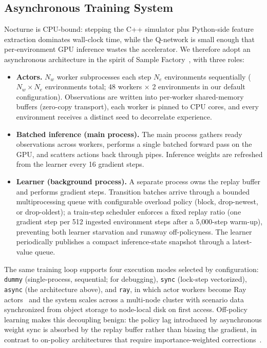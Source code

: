 \documentclass{article}
\begin{document}
\subsection{Asynchronous Training System}
\label{sec:system}

Nocturne is CPU-bound: stepping the C++ simulator plus Python-side feature
extraction dominates wall-clock time, while the Q-network is small enough
that per-environment GPU inference wastes the accelerator. We therefore
adopt an asynchronous architecture in the spirit of Sample
Factory~\citep{petrenko2020sample}, with three roles:

\begin{itemize}
  \item \textbf{Actors.} $N_w$ worker subprocesses each step $N_e$
  environments sequentially ($N_w \times N_e$ environments total; 48 workers
  $\times$ 2 environments in our default configuration). Observations are
  written into per-worker shared-memory buffers (zero-copy transport), each
  worker is pinned to CPU cores, and every environment receives a distinct
  seed to decorrelate experience.
  \item \textbf{Batched inference (main process).} The main process gathers
  ready observations across workers, performs a single batched forward pass
  on the GPU, and scatters actions back through pipes. Inference weights are
  refreshed from the learner every 16 gradient steps.
  \item \textbf{Learner (background process).} A separate process owns the
  replay buffer and performs gradient steps. Transition batches arrive
  through a bounded multiprocessing queue with configurable overload policy
  (block, drop-newest, or drop-oldest); a train-step scheduler enforces a
  fixed replay ratio (one gradient step per 512 ingested environment steps
  after a 5{,}000-step warm-up), preventing both learner starvation and
  runaway off-policyness. The learner periodically publishes a compact
  inference-state snapshot through a latest-value queue.
\end{itemize}

The same training loop supports four execution modes selected by
configuration: \texttt{dummy} (single-process, sequential; for debugging),
\texttt{sync} (lock-step vectorized), \texttt{async} (the architecture
above), and \texttt{ray}, in which actor workers become Ray
actors~\citep{moritz2018ray} and the system scales across a multi-node
cluster with scenario data synchronized from object storage to node-local
disk on first access. Off-policy learning makes this decoupling benign: the
policy lag introduced by asynchronous weight sync is absorbed by the replay
buffer rather than biasing the gradient, in contrast to on-policy
architectures that require importance-weighted
corrections~\citep{espeholt2018impala}.
\end{document}
